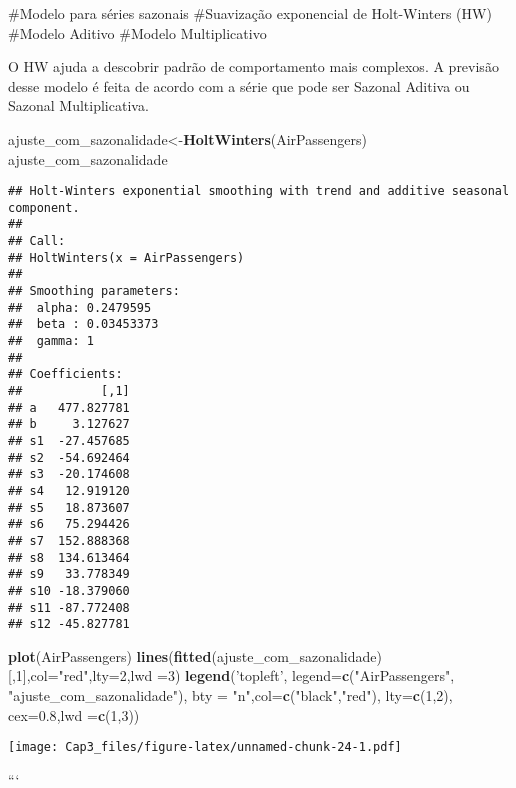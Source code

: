 \documentclass[]{article}
\newenvironment{Shaded}{\begin{snugshade}}{\end{snugshade}}
\newcommand{\DataTypeTok}[1]{\textcolor[rgb]{0.13,0.29,0.53}{#1}}
\newcommand{\DecValTok}[1]{\textcolor[rgb]{0.00,0.00,0.81}{#1}}
\newcommand{\FloatTok}[1]{\textcolor[rgb]{0.00,0.00,0.81}{#1}}
\newcommand{\KeywordTok}[1]{\textcolor[rgb]{0.13,0.29,0.53}{\textbf{#1}}}
\newcommand{\NormalTok}[1]{#1}
\newcommand{\StringTok}[1]{\textcolor[rgb]{0.31,0.60,0.02}{#1}}
\begin{document}
\#Modelo para séries sazonais \#Suavização exponencial de Holt-Winters
(HW) \#Modelo Aditivo \#Modelo Multiplicativo

O HW ajuda a descobrir padrão de comportamento mais complexos. A
previsão desse modelo é feita de acordo com a série que pode ser Sazonal
Aditiva ou Sazonal Multiplicativa.

\begin{Shaded}
\begin{Highlighting}[]
\NormalTok{ajuste_com_sazonalidade<-}\KeywordTok{HoltWinters}\NormalTok{(AirPassengers)}
\NormalTok{ajuste_com_sazonalidade}
\end{Highlighting}
\end{Shaded}

\begin{verbatim}
## Holt-Winters exponential smoothing with trend and additive seasonal component.
## 
## Call:
## HoltWinters(x = AirPassengers)
## 
## Smoothing parameters:
##  alpha: 0.2479595
##  beta : 0.03453373
##  gamma: 1
## 
## Coefficients:
##           [,1]
## a   477.827781
## b     3.127627
## s1  -27.457685
## s2  -54.692464
## s3  -20.174608
## s4   12.919120
## s5   18.873607
## s6   75.294426
## s7  152.888368
## s8  134.613464
## s9   33.778349
## s10 -18.379060
## s11 -87.772408
## s12 -45.827781
\end{verbatim}

\begin{Shaded}
\begin{Highlighting}[]
\KeywordTok{plot}\NormalTok{(AirPassengers)}
\KeywordTok{lines}\NormalTok{(}\KeywordTok{fitted}\NormalTok{(ajuste_com_sazonalidade)[,}\DecValTok{1}\NormalTok{],}\DataTypeTok{col=}\StringTok{"red"}\NormalTok{,}\DataTypeTok{lty=}\DecValTok{2}\NormalTok{,}\DataTypeTok{lwd =}\DecValTok{3}\NormalTok{)}
\KeywordTok{legend}\NormalTok{(}\StringTok{'topleft'}\NormalTok{, }\DataTypeTok{legend=}\KeywordTok{c}\NormalTok{(}\StringTok{"AirPassengers"}\NormalTok{, }\StringTok{"ajuste_com_sazonalidade"}\NormalTok{),}
  \DataTypeTok{bty =} \StringTok{"n"}\NormalTok{,}\DataTypeTok{col=}\KeywordTok{c}\NormalTok{(}\StringTok{"black"}\NormalTok{,}\StringTok{"red"}\NormalTok{), }\DataTypeTok{lty=}\KeywordTok{c}\NormalTok{(}\DecValTok{1}\NormalTok{,}\DecValTok{2}\NormalTok{), }\DataTypeTok{cex=}\FloatTok{0.8}\NormalTok{,}\DataTypeTok{lwd =}\KeywordTok{c}\NormalTok{(}\DecValTok{1}\NormalTok{,}\DecValTok{3}\NormalTok{))}
\end{Highlighting}
\end{Shaded}

\texttt{[image: Cap3\_files/figure-latex/unnamed-chunk-24-1.pdf]}

```
\end{document}
